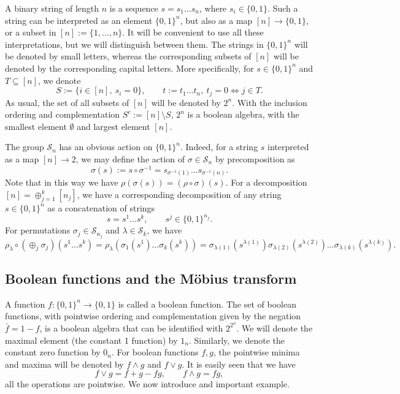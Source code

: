 \documentclass[12pt]{article}
\theoremstyle{definition}
\theoremstyle{remark}
\def\permut{\mathscr{S}}
\begin{document}
A binary string of length $n$ is a sequence  $s=s_1\dots s_n$, where $s_i\in
\{0,1\}$. Such a string can be interpreted as an element $\{0,1\}^n$, but also as a 
map $[n]\to \{0,1\}$, or a subset in  $[n]:=\{1,\dots,n\}$. It will be convenient to use
all these interpretations, but we will distinguish between them. The strings in
$\{0,1\}^n$ will be denoted by small letters, whereas the corresponding subsets of $[n]$
will be denoted by the corresponding capital letters. More specifically, for $s\in \{0,1\}^n$ and 
$T\subseteq [n]$, we denote
\begin{equation}\label{eq:string_subset}
S:=\{i\in [n],\ s_i=0\},\qquad t:=t_1\dots t_n,\ t_j=0 \iff j\in T.
\end{equation}
As usual, the set of all subsets of $[n]$ will be denoted by $2^n$. 
With the inclusion ordering and complementation $S^c:=[n]\setminus S$,
$2^n$ is a boolean algebra, with the smallest element $\emptyset$ and largest element
$[n]$.  

The group $\permut_n$ has an obvious action on $\{0,1\}^n$. Indeed,
 for a string $s$  interpreted as a map $[n]\to 2$, we may define the action of
$\sigma\in \permut_n$ by precomposition as
\[
\sigma(s):=s\circ\sigma^{-1}=s_{\sigma^{-1}(1)}\dots s_{\sigma^{-1}(n)}.
\]
Note that in this way we have $\rho(\sigma(s))=(\rho\circ \sigma)(s)$. For a decomposition
$[n]=\oplus_{j=1}^k[n_j]$, we have a corresponding decomposition of
any string $s\in \{0,1\}^n$ as a concatenation of strings
\[
s=s^1\dots s^k,\qquad s^j\in \{0,1\}^{n_j}.
\]
For permutations $\sigma_j\in \permut_{n_j}$ and  $\lambda\in
\permut_k$, we have
\[
\rho_\lambda\circ(\oplus_j\sigma_j)(s^1\dots s^k)=\rho_\lambda(\sigma_1(s^1)\dots
\sigma_k(s^k))=\sigma_{\lambda(1)}(s^{\lambda(1)})\sigma_{\lambda(2)}(s^{\lambda(2)})\dots
\sigma_{\lambda(k)}(s^{\lambda(k)}).
\]





\subsection{Boolean functions and the  M\"obius transform}
\label{sec:boolean}

A function $f:\{0,1\}^n\to \{0,1\}$ is called a boolean function. 
The set of boolean functions, with pointwise ordering and complementation given by the
negation $\bar f=1-f$,  is a boolean algebra that can be identified with $2^{2^n}$.
We will denote the maximal element (the constant 1 function) by $1_n$. Similarly,
we denote the constant zero function by $0_n$.  For boolean
functions $f,g$, the pointwise minima and maxima will be denoted by $f\wedge g$ and $f\vee
g$. It is easily seen that we have
\begin{equation}\label{eq:wedgevee_fun}
f\vee g= f+g-fg,\qquad f\wedge g=fg,
\end{equation}
all the operations are pointwise. We now introduce and important example. 
\end{document}
